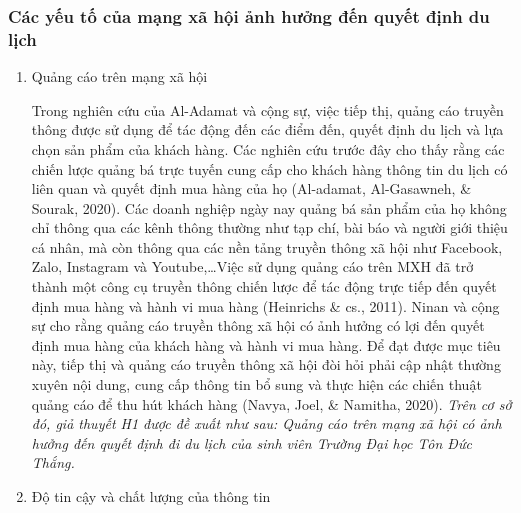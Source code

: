 		\subsubsection{Các yếu tố của mạng xã hội ảnh hưởng đến quyết định du lịch}
		\begin{enumerate}[label = \alph*)]
			\item Quảng cáo trên mạng xã hội
			
			Trong nghiên cứu của Al-Adamat và cộng sự, việc tiếp thị, quảng cáo truyền thông được sử dụng để tác động đến các điểm đến, quyết định du lịch và lựa chọn sản phẩm của khách hàng. Các nghiên cứu trước đây cho thấy rằng các chiến lược quảng bá trực tuyến cung cấp cho khách hàng thông tin du lịch có liên quan và quyết định mua hàng của họ (Al-adamat, Al-Gasawneh, \& Sourak, 2020). Các doanh nghiệp ngày nay quảng bá sản phẩm của họ không chỉ thông qua các kênh thông thường như tạp chí, bài báo và người giới thiệu cá nhân, mà còn thông qua các nền tảng truyền thông xã hội như Facebook, Zalo, Instagram và Youtube,…Việc sử dụng quảng cáo trên MXH đã trở thành một công cụ truyền thông chiến lược để tác động trực tiếp đến quyết định mua hàng và hành vi mua hàng (Heinrichs \& cs., 2011). Ninan và cộng sự cho rằng quảng cáo truyền thông xã hội có ảnh hưởng có lợi đến quyết định mua hàng của khách hàng và hành vi mua hàng. Để đạt được mục tiêu này, tiếp thị và quảng cáo truyền thông xã hội đòi hỏi phải cập nhật thường xuyên nội dung, cung cấp thông tin bổ sung và thực hiện các chiến thuật quảng cáo để thu hút khách hàng (Navya, Joel, \& Namitha, 2020).\textit{ Trên cơ sở đó, giả thuyết H1 được đề xuất như sau: Quảng cáo trên mạng xã hội có ảnh hưởng đến quyết định đi du lịch của sinh viên Trường Đại học Tôn Đức Thắng.}
			\item Độ tin cậy và chất lượng của thông tin
			

\end{enumerate}
